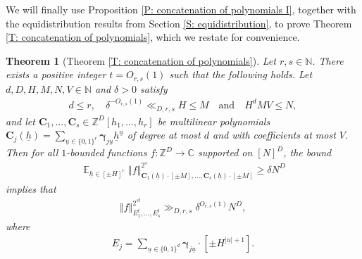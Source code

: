 \documentclass[11pt]{amsart}
\newtheorem*{theorem*}{Theorem}
\theoremstyle{definition}
\DeclareMathOperator*{\E}{\mathbb{E}}
\newcommand{\C}{{\mathbb C}}
\newcommand{\N}{{\mathbb N}}
\newcommand{\Z}{{\mathbb Z}}
\newcommand{\bc}{{\textbf{C}}}
\newcommand{\bgamma}{{\boldsymbol{\gamma}}}
\newcommand{\uh}{{\underline{h}}}
\newcommand{\uu}{{\underline{u}}}
\newcommand{\norm}[1]{\left\Vert #1\right\Vert}
\begin{document}
We will finally use Proposition \ref{P: concatenation of polynomials I}, together with the equidistribution results from Section \ref{S: equidistribution}, to prove Theorem \ref{T: concatenation of polynomials}, which we restate for convenience.

\begin{theorem*}[Theorem \ref{T: concatenation of polynomials}]
Let $r,s \in \N$.  There exists a positive integer $t=O_{r, s}(1)$ such that the following holds.  Let $d, D, H, M, N, V\in\N$ and $\delta>0$ satisfy
    \begin{align*}
        d\leq r,\quad \delta^{-O_{r, s}(1)}\ll_{D, r, s} H\leq M\quad \textrm{and}\quad H^d M V\leq N,
    \end{align*}
    and let $\bc_1, \ldots, \bc_s\in\Z^D[h_1, \ldots, h_r]$ be multilinear polynomials $\bc_j(\uh) = \sum\limits_{\uu\in\{0,1\}^r} \bgamma_{j\uu}\uh^\uu$ of degree at most $d$ and with coefficients at most $V$.  Then for all $1$-bounded functions $f:\Z^D\to\C$ supported on $[N]^D$, the bound
    \begin{align*}
        \E_{\uh\in[\pm H]^r}\norm{f}_{\bc_1(\uh)\cdot[\pm M], \ldots, \bc_s(\uh)\cdot[\pm M]}^{2^s}\geq \delta N^D
    \end{align*}
        implies that
    \begin{align*}
        \norm{f}_{E_1^{ t}, \ldots, E_s^{ t}}^{2^{st}}\gg_{D, r, s}\delta^{O_{r, s}(1)}N^{D},
    \end{align*}
    where
    \begin{align*}
        E_j = \sum_{\uu\in\{0,1\}^d}\bgamma_{j\uu}\cdot [\pm H^{|\uu|+1}].
    \end{align*} 
\end{theorem*}
\end{document}
